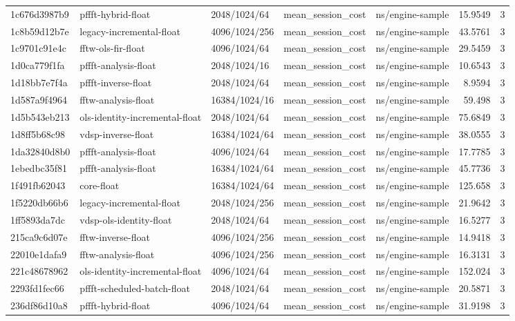\begin{longtable}{lllllrr}
1c676d3987b9 & pffft-hybrid-float & 2048/1024/64 & mean\_session\_cost & ns/engine-sample & 15.9549 & 3 \\
1c8b59d12b7e & legacy-incremental-float & 4096/1024/256 & mean\_session\_cost & ns/engine-sample & 43.5761 & 3 \\
1c9701c91e4c & fftw-ols-fir-float & 4096/1024/64 & mean\_session\_cost & ns/engine-sample & 29.5459 & 3 \\
1d0ca779f1fa & pffft-analysis-float & 2048/1024/16 & mean\_session\_cost & ns/engine-sample & 10.6543 & 3 \\
1d18bb7e7f4a & pffft-inverse-float & 2048/1024/64 & mean\_session\_cost & ns/engine-sample & 8.9594 & 3 \\
1d587a9f4964 & fftw-analysis-float & 16384/1024/16 & mean\_session\_cost & ns/engine-sample & 59.498 & 3 \\
1d5b543eb213 & ols-identity-incremental-float & 2048/1024/64 & mean\_session\_cost & ns/engine-sample & 75.6849 & 3 \\
1d8ff5b68c98 & vdsp-inverse-float & 16384/1024/64 & mean\_session\_cost & ns/engine-sample & 38.0555 & 3 \\
1da32840d8b0 & pffft-analysis-float & 4096/1024/64 & mean\_session\_cost & ns/engine-sample & 17.7785 & 3 \\
1ebedbc35f81 & pffft-analysis-float & 16384/1024/64 & mean\_session\_cost & ns/engine-sample & 45.7736 & 3 \\
1f491fb62043 & core-float & 16384/1024/64 & mean\_session\_cost & ns/engine-sample & 125.658 & 3 \\
1f5220db66b6 & legacy-incremental-float & 2048/1024/256 & mean\_session\_cost & ns/engine-sample & 21.9642 & 3 \\
1ff5893da7dc & vdsp-ols-identity-float & 2048/1024/64 & mean\_session\_cost & ns/engine-sample & 16.5277 & 3 \\
215ca9c6d07e & fftw-inverse-float & 4096/1024/256 & mean\_session\_cost & ns/engine-sample & 14.9418 & 3 \\
22010e1dafa9 & fftw-analysis-float & 4096/1024/256 & mean\_session\_cost & ns/engine-sample & 16.3131 & 3 \\
221c48678962 & ols-identity-incremental-float & 4096/1024/64 & mean\_session\_cost & ns/engine-sample & 152.024 & 3 \\
2293fd1fec66 & pffft-scheduled-batch-float & 2048/1024/64 & mean\_session\_cost & ns/engine-sample & 20.5871 & 3 \\
236df86d10a8 & pffft-hybrid-float & 4096/1024/64 & mean\_session\_cost & ns/engine-sample & 31.9198 & 3 \\

\end{longtable}
